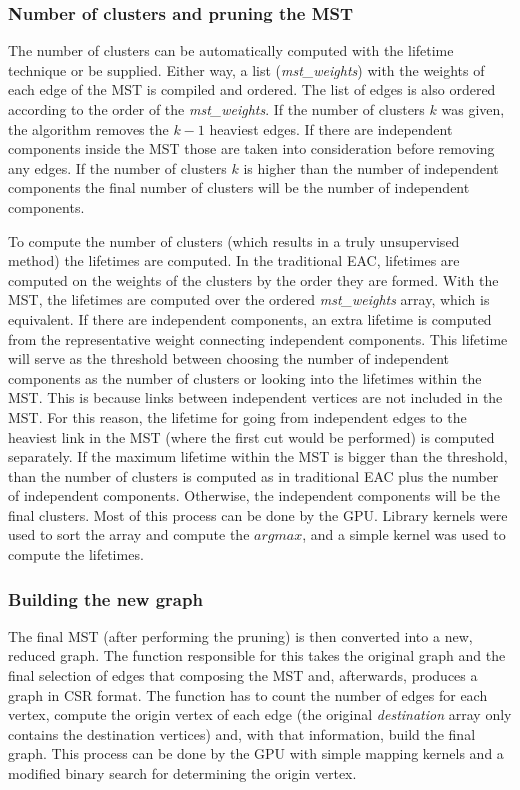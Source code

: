 \subsubsection{Number of clusters and pruning the MST}
The number of clusters can be automatically computed with the lifetime technique or be supplied. 
Either way, a list (\emph{mst\_weights}) with the weights of each edge of the MST is compiled and ordered.
The list of edges is also ordered according to the order of the \emph{mst\_weights}. 
If the number of clusters $k$ was given, the algorithm removes the $k - 1$ heaviest edges. 
If there are independent components inside the MST those are taken into consideration before removing any edges.
If the number of clusters $k$ is higher than the number of independent components the final number of clusters will be the number of independent components.

To compute the number of clusters (which results in a truly unsupervised method) the lifetimes are computed.
In the traditional EAC, lifetimes are computed on the weights of the clusters by the order they are formed.
With the MST, the lifetimes are computed over the ordered \emph{mst\_weights} array, which is equivalent.
If there are independent components, an extra lifetime is computed from the representative weight connecting independent components.
This lifetime will serve as the threshold between choosing the number of independent components as the number of clusters or looking into the lifetimes within the MST.
This is because links between independent vertices are not included in the MST.
For this reason, the lifetime for going from independent edges to the heaviest link in the MST (where the first cut would be performed) is computed separately.
If the maximum lifetime within the MST is bigger than the threshold, than the number of clusters is computed as in traditional EAC plus the number of independent components.
Otherwise, the independent components will be the final clusters.
Most of this process can be done by the GPU.
Library kernels were used to sort the array and compute the $arg max$, and a simple kernel was used to compute the lifetimes.

\subsubsection{Building the new graph}
The final MST (after performing the pruning) is then converted into a new, reduced graph.
The function responsible for this takes the original graph and the final selection of edges that composing the MST and, afterwards, produces a graph in CSR format.
The function has to count the number of edges for each vertex, compute the origin vertex of each edge (the original \emph{destination} array only contains the destination vertices) and, with that information, build the final graph.
This process can be done by the GPU with simple mapping kernels and a modified binary search for determining the origin vertex.

